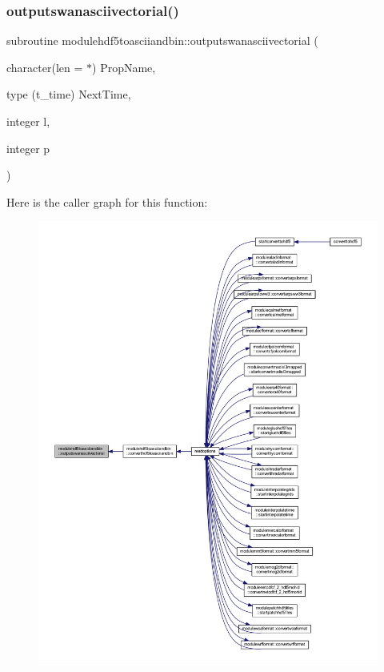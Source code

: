 \subsubsection{\texorpdfstring{outputswanasciivectorial()}{outputswanasciivectorial()}}
{\footnotesize\ttfamily subroutine modulehdf5toasciiandbin\+::outputswanasciivectorial (\begin{DoxyParamCaption}\item[{character(len = $\ast$)}]{Prop\+Name,  }\item[{type (t\+\_\+time)}]{Next\+Time,  }\item[{integer}]{l,  }\item[{integer}]{p }\end{DoxyParamCaption})\hspace{0.3cm}{\ttfamily [private]}}

Here is the caller graph for this function\+:\nopagebreak
\begin{figure}[H]
\begin{center}
\leavevmode
\includegraphics[width=350pt]{namespacemodulehdf5toasciiandbin_a1065af2accb4bf167b115af350e3c406_icgraph}
\end{center}
\end{figure}
\mbox{\label{namespacemodulehdf5toasciiandbin_a360088fc269895ed548f164fb5b46a13}} 
